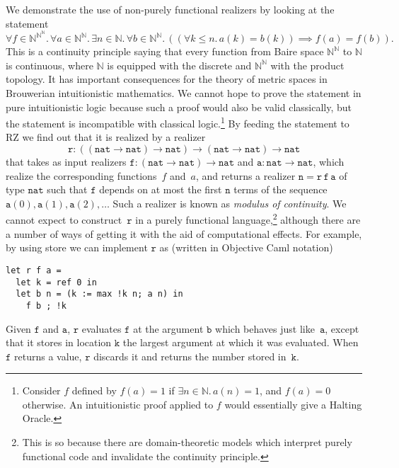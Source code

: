 \documentclass{entcs} \usepackage{prentcsmacro}
\newcommand{\NN}{{\mathbb N}}
\newcommand{\nat}{\mathtt{nat}}
\begin{document}
We demonstrate the use of non-purely functional realizers by looking
at the statement
%
\begin{equation*}
  \forall f \in \NN^{\NN^\NN} .\,
  \forall a \in  \NN^\NN.\,
  \exists n \in \NN .\,
  \forall b \in \NN^\NN .\,
  ((\forall k \leq n .\, a(k) = b(k)) \implies f(a) = f(b)).
\end{equation*}
%
This is a continuity principle saying that every function from Baire
space $\NN^\NN$ to $\NN$ is continuous, where $\NN$ is equipped with
the discrete and $\NN^\NN$ with the product topology. It has important
consequences for the theory of metric spaces in Brouwerian
intuitionistic mathematics. We cannot hope to prove the statement in
pure intuitionistic logic because such a proof would also be valid
classically, but the statement is incompatible with classical
logic.\footnote{Consider $f$ defined by $f(a) = 1$ if $\exists n \in
  \NN .\, a(n) = 1$, and $f(a) = 0$ otherwise. An intuitionistic proof
  applied to $f$ would essentially give a Halting Oracle.} By feeding
the statement to RZ we find out that it is realized by a realizer
%
\begin{equation*}
  \mathtt{r} :
  ((\nat \to \nat) \to \nat) \to
  (\nat \to \nat) \to \nat
\end{equation*}
%
that takes as input realizers $\mathtt{f} : (\nat \to \nat) \to \nat$
and $\mathtt{a} : \nat \to \nat$, which realize the corresponding
functions~$f$ and~$a$, and returns a realizer $\mathtt{n} =
\mathtt{r}\, \mathtt{f} \, \mathtt{a}$ of type $\nat$ such that
$\mathtt{f}$ depends on at most the first $\mathtt{n}$ terms of the
sequence $\mathtt{a}(0), \mathtt{a}(1), \mathtt{a}(2), \ldots$ Such a
realizer is known as \emph{modulus of continuity}.  We cannot expect
to construct~$\mathtt{r}$ in a purely functional
language,\footnote{This is so because there are domain-theoretic
  models which interpret purely functional code and invalidate the
  continuity principle.}  although there are a number of ways of
getting it with the aid of computational effects. For example, by
using store we can implement $\mathtt{r}$ as (written in Objective
Caml notation)
%
\begin{verbatim}
let r f a =
  let k = ref 0 in
  let b n = (k := max !k n; a n) in
    f b ; !k
\end{verbatim}
%
Given $\mathtt{f}$ and $\mathtt{a}$, $\mathtt{r}$ evaluates
$\mathtt{f}$ at the argument $\mathtt{b}$ which behaves just
like~$\mathtt{a}$, except that it stores in location $\mathtt{k}$ the
largest argument at which it was evaluated. When $\mathtt{f}$ returns
a value, $\mathtt{r}$ discards it and returns the number stored
in~$\mathtt{k}$.
\end{document}
